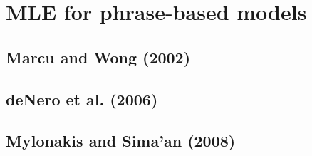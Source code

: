 \section{MLE for phrase-based models}
\subsection{Marcu and Wong (2002)}




\subsection{deNero et al. (2006)}




\subsection{Mylonakis and Sima'an (2008)}



